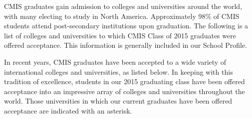 CMIS graduates gain admission to colleges and universities around the world, with many electing to study in North America. Approximately 98\% of CMIS students attend post­-secondary institutions upon graduation. The following is a list of colleges and universities to which CMIS Class of 2015 graduates were offered acceptance.  This information is generally included in our School Profile.

\href{https://docs.google.com/document/d/1i8tDt8omsO9Zz4Zj40uOpUz8twkbGHYSk_PDs3Rqup4/edit}{}

In recent years, CMIS graduates have been accepted to a wide variety of international colleges and universities, as listed below. In keeping with this tradition of excellence, students in our 2015 graduating class have been offered acceptance into an impressive array of colleges and universities throughout the world. Those universities in which our current graduates have been offered acceptance are indicated with an asterisk. 

